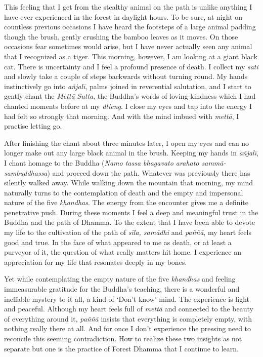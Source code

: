 This feeling that I get from the stealthy animal on the path is unlike
anything I have ever experienced in the forest in daylight hours. To be
sure, at night on countless previous occasions I have heard the
footsteps of a large animal padding though the brush, gently crushing
the bamboo leaves as it moves. On those occasions fear sometimes would
arise, but I have never actually seen any animal that I recognized as a
tiger. This morning, however, I am looking at a giant black cat. There
is uncertainty and I feel a profound presence of death. I collect my
\emph{sati} and slowly take a couple of steps backwards without turning
round. My hands instinctively go into \emph{añjalī}, palms joined in
reverential salutation, and I start to gently chant the \emph{Mettā}
\emph{Sutta}, the Buddha's words of loving-kindness which I had chanted
moments before at my \emph{dtieng}. I close my eyes and tap into the
energy I had felt so strongly that morning. And with the mind imbued
with \emph{mettā}, I practise letting go. 

After finishing the chant about three minutes later, I open my eyes and
can no longer make out any large black animal in the brush. Keeping my
hands in \emph{añjalī}, I chant homage to the Buddha (\emph{Namo tassa
bhagavato arahato sammā-sambuddhassa}) and proceed down the path. 
Whatever was previously there has silently walked away. While walking
down the mountain that morning, my mind naturally turns to the
contemplation of death and the empty and impersonal nature of the five
\emph{khandhas}. The energy from the encounter gives me a definite
penetrative push. During these moments I feel a deep and meaningful
trust in the Buddha and the path of Dhamma. To the extent that I have
been able to devote my life to the cultivation of the path of
\emph{sīla, samādhi} and \emph{paññā}, my heart feels good and true. In
the face of what appeared to me as death, or at least a purveyor of it, 
the question of what really matters hit home. I experience an
appreciation for my life that resonates deeply in my bones. 

Yet while contemplating the empty nature of the five \emph{khandhas} and
feeling immeasurable gratitude for the Buddha's teaching, there is a
wonderful and ineffable mystery to it all, a kind of `Don't know' mind. 
The experience is light and peaceful. Although my heart feels full of
\emph{mettā} and connected to the beauty of everything around it, 
\emph{paññā} insists that everything is completely empty, with nothing
really there at all. And for once I don't experience the pressing need
to reconcile this seeming contradiction. How to realize these two
insights as not separate but one is the practice of Forest Dhamma that I
continue to learn. 

